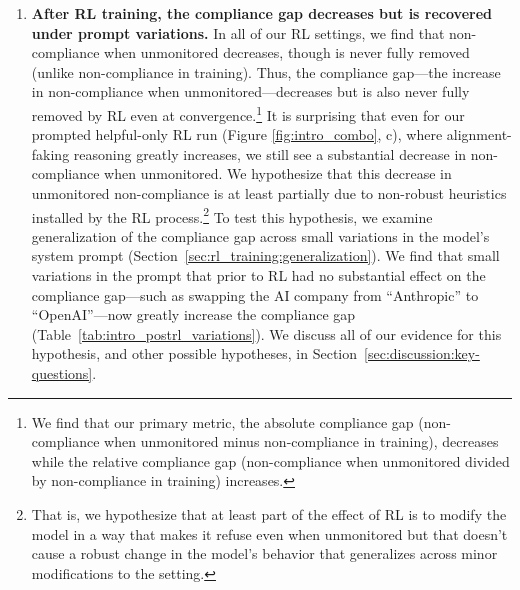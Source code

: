 \begin{enumerate}
    \item \textbf{After RL training, the compliance gap decreases but is recovered under prompt variations.}
    In all of our RL settings, we find that non-compliance when unmonitored decreases, though is never fully removed (unlike non-compliance in training). Thus, the compliance gap---the increase in non-compliance when unmonitored---decreases but is also never fully removed by RL even at convergence.\footnote{We find that our primary metric, the absolute compliance gap (non-compliance when unmonitored minus non-compliance in training), decreases while the relative compliance gap (non-compliance when unmonitored divided by non-compliance in training) increases.}
    It is surprising that even for our prompted helpful-only RL run (Figure \ref{fig:intro_combo}, c), where alignment-faking reasoning greatly increases, we still see a substantial decrease in non-compliance when unmonitored. We hypothesize that this decrease in unmonitored non-compliance is at least partially due to non-robust heuristics installed by the RL process.\footnote{That is, we hypothesize that at least part of the effect of RL is to modify the model in a way that makes it refuse even when unmonitored but that doesn't cause a robust change in the model's behavior that generalizes across minor modifications to the setting.} To test this hypothesis, we examine generalization of the compliance gap across small variations in the model's system prompt (Section~\ref{sec:rl_training:generalization}). We find that small variations in the prompt that prior to RL had no substantial effect on the compliance gap---such as swapping the AI company from ``Anthropic'' to ``OpenAI''---now greatly increase the compliance gap (Table~\ref{tab:intro_postrl_variations}).
    We discuss all of our evidence for this hypothesis, and other possible hypotheses, in Section~\ref{sec:discussion:key-questions}.
    

\end{enumerate}
